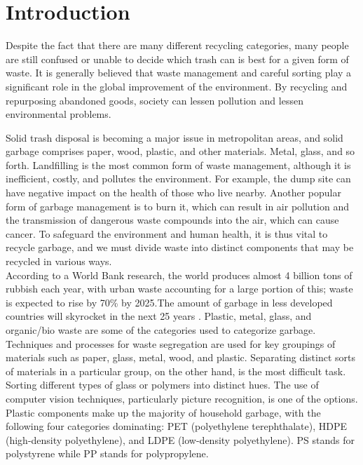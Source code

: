 \documentclass[conference]{IEEEtran}
\begin{document}
\section{Introduction}

Despite the fact that there are many different recycling categories, many people are still confused or unable to decide which trash can is best for a given form of waste. It is generally believed that waste management and careful sorting play a significant role in the global improvement of the environment. By recycling and repurposing abandoned goods, society can lessen pollution and lessen environmental problems.

Solid trash disposal is becoming a major issue in metropolitan areas, and solid garbage comprises paper, wood, plastic, and other materials. Metal, glass, and so forth. Landfilling is the most common form of waste management, although it is inefficient, costly, and pollutes the environment. For example, the dump site can have negative impact on the health of those who live nearby. Another popular form of garbage management is to burn it, which can result in air pollution and the transmission of dangerous waste compounds into the air, which can cause cancer. To safeguard the environment and human health, it is thus vital to recycle garbage, and we must divide waste into distinct components that may be recycled in various ways.\vspace{1mm}\\According to a World Bank research, the world produces almost 4 billion tons of rubbish each year, with urban waste accounting for a large portion of this; waste is expected to rise by 70\% by 2025.The amount of garbage in less developed countries will skyrocket in the next 25 years \cite{b1}.
Plastic, metal, glass, and organic/bio waste are some of the categories used to categorize garbage. Techniques and processes for waste \cite{b2} segregation are used for key groupings of materials such as paper, glass, metal, wood, and plastic. Separating distinct sorts of materials in a particular group, on the other hand, is the most difficult task. Sorting different types of glass or polymers into distinct hues. The use of computer vision techniques, particularly picture recognition, is one of the options. Plastic components make up the majority of household garbage, with the following four categories dominating: PET (polyethylene terephthalate), HDPE (high-density polyethylene), and LDPE (low-density polyethylene). PS stands for polystyrene while PP stands for polypropylene.
\end{document}
